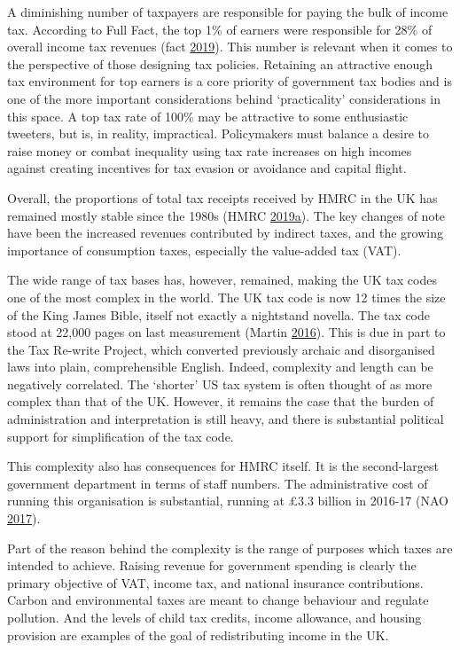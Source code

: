 \documentclass[]{tufte-handout}
\begin{document}
A diminishing number of taxpayers are responsible for paying the bulk of
income tax. According to Full Fact, the top 1\% of earners were
responsible for 28\% of overall income tax revenues (fact
\protect\hyperlink{ref-FullFact2019}{2019}). This number is relevant
when it comes to the perspective of those designing tax policies.
Retaining an attractive enough tax environment for top earners is a core
priority of government tax bodies and is one of the more important
considerations behind `practicality' considerations in this space. A top
tax rate of 100\% may be attractive to some enthusiastic tweeters, but
is, in reality, impractical. Policymakers must balance a desire to raise
money or combat inequality using tax rate increases on high incomes
against creating incentives for tax evasion or avoidance and capital
flight.

Overall, the proportions of total tax receipts received by HMRC in the
UK has remained mostly stable since the 1980s (HMRC
\protect\hyperlink{ref-HMRC2019}{2019}\protect\hyperlink{ref-HMRC2019}{a}).
The key changes of note have been the increased revenues contributed by
indirect taxes, and the growing importance of consumption taxes,
especially the value-added tax (VAT).

The wide range of tax bases has, however, remained, making the UK tax
codes one of the most complex in the world. The UK tax code is now 12
times the size of the King James Bible, itself not exactly a nightstand
novella. The tax code stood at 22,000 pages on last measurement (Martin
\protect\hyperlink{ref-Martin}{2016}). This is due in part to the Tax
Re-write Project, which converted previously archaic and disorganised
laws into plain, comprehensible English. Indeed, complexity and length
can be negatively correlated. The `shorter' US tax system is often
thought of as more complex than that of the UK. However, it remains the
case that the burden of administration and interpretation is still
heavy, and there is substantial political support for simplification of
the tax code.

This complexity also has consequences for HMRC itself. It is the
second-largest government department in terms of staff numbers. The
administrative cost of running this organisation is substantial, running
at £3.3 billion in 2016-17 (NAO \protect\hyperlink{ref-NAO2017}{2017}).

Part of the reason behind the complexity is the range of purposes which
taxes are intended to achieve. Raising revenue for government spending
is clearly the primary objective of VAT, income tax, and national
insurance contributions. Carbon and environmental taxes are meant to
change behaviour and regulate pollution. And the levels of child tax
credits, income allowance, and housing provision are examples of the
goal of redistributing income in the UK.
\end{document}
